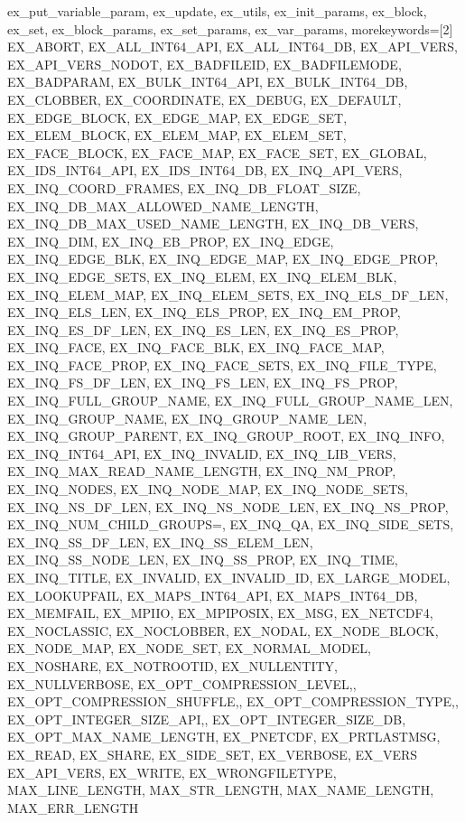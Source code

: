{{ex_put_variable_param,
ex_update,
ex_utils,
ex_init_params,
ex_block,
ex_set,
ex_block_params,
ex_set_params,
ex_var_params},
morekeywords=[2]{
EX_ABORT,
EX_ALL_INT64_API,
EX_ALL_INT64_DB,
EX_API_VERS,
EX_API_VERS_NODOT,
EX_BADFILEID,
EX_BADFILEMODE,
EX_BADPARAM,
EX_BULK_INT64_API,
EX_BULK_INT64_DB,
EX_CLOBBER,
EX_COORDINATE,
EX_DEBUG,
EX_DEFAULT,
EX_EDGE_BLOCK,
EX_EDGE_MAP,
EX_EDGE_SET,
EX_ELEM_BLOCK,
EX_ELEM_MAP,
EX_ELEM_SET,
EX_FACE_BLOCK,
EX_FACE_MAP,
EX_FACE_SET,
EX_GLOBAL,
EX_IDS_INT64_API,
EX_IDS_INT64_DB,
EX_INQ_API_VERS,
EX_INQ_COORD_FRAMES,
EX_INQ_DB_FLOAT_SIZE,
EX_INQ_DB_MAX_ALLOWED_NAME_LENGTH,
EX_INQ_DB_MAX_USED_NAME_LENGTH,
EX_INQ_DB_VERS,
EX_INQ_DIM,
EX_INQ_EB_PROP,
EX_INQ_EDGE,
EX_INQ_EDGE_BLK,
EX_INQ_EDGE_MAP,
EX_INQ_EDGE_PROP,
EX_INQ_EDGE_SETS,
EX_INQ_ELEM,
EX_INQ_ELEM_BLK,
EX_INQ_ELEM_MAP,
EX_INQ_ELEM_SETS,
EX_INQ_ELS_DF_LEN,
EX_INQ_ELS_LEN,
EX_INQ_ELS_PROP,
EX_INQ_EM_PROP,
EX_INQ_ES_DF_LEN,
EX_INQ_ES_LEN,
EX_INQ_ES_PROP,
EX_INQ_FACE,
EX_INQ_FACE_BLK,
EX_INQ_FACE_MAP,
EX_INQ_FACE_PROP,
EX_INQ_FACE_SETS,
EX_INQ_FILE_TYPE,
EX_INQ_FS_DF_LEN,
EX_INQ_FS_LEN,
EX_INQ_FS_PROP,
EX_INQ_FULL_GROUP_NAME,
EX_INQ_FULL_GROUP_NAME_LEN,
EX_INQ_GROUP_NAME,
EX_INQ_GROUP_NAME_LEN,
EX_INQ_GROUP_PARENT,
EX_INQ_GROUP_ROOT,
EX_INQ_INFO,
EX_INQ_INT64_API,
EX_INQ_INVALID,
EX_INQ_LIB_VERS,
EX_INQ_MAX_READ_NAME_LENGTH,
EX_INQ_NM_PROP,
EX_INQ_NODES,
EX_INQ_NODE_MAP,
EX_INQ_NODE_SETS,
EX_INQ_NS_DF_LEN,
EX_INQ_NS_NODE_LEN,
EX_INQ_NS_PROP,
EX_INQ_NUM_CHILD_GROUPS=,
EX_INQ_QA,
EX_INQ_SIDE_SETS,
EX_INQ_SS_DF_LEN,
EX_INQ_SS_ELEM_LEN,
EX_INQ_SS_NODE_LEN,
EX_INQ_SS_PROP,
EX_INQ_TIME,
EX_INQ_TITLE,
EX_INVALID,
EX_INVALID_ID,
EX_LARGE_MODEL,
EX_LOOKUPFAIL,
EX_MAPS_INT64_API,
EX_MAPS_INT64_DB,
EX_MEMFAIL,
EX_MPIIO,
EX_MPIPOSIX,
EX_MSG,
EX_NETCDF4,
EX_NOCLASSIC,
EX_NOCLOBBER,
EX_NODAL,
EX_NODE_BLOCK,
EX_NODE_MAP,
EX_NODE_SET,
EX_NORMAL_MODEL,
EX_NOSHARE,
EX_NOTROOTID,
EX_NULLENTITY,
EX_NULLVERBOSE,
EX_OPT_COMPRESSION_LEVEL,,
EX_OPT_COMPRESSION_SHUFFLE,,
EX_OPT_COMPRESSION_TYPE,,
EX_OPT_INTEGER_SIZE_API,,
EX_OPT_INTEGER_SIZE_DB,
EX_OPT_MAX_NAME_LENGTH,
EX_PNETCDF,
EX_PRTLASTMSG,
EX_READ,
EX_SHARE,
EX_SIDE_SET,
EX_VERBOSE,
EX_VERS EX_API_VERS,
EX_WRITE,
EX_WRONGFILETYPE,
MAX_LINE_LENGTH,
MAX_STR_LENGTH,
MAX_NAME_LENGTH,
MAX_ERR_LENGTH
}}

